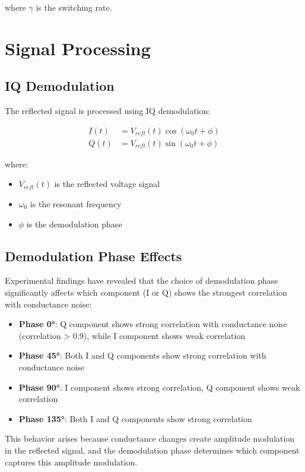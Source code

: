 \documentclass{article}
\begin{document}
where $\gamma$ is the switching rate.

\section{Signal Processing}

\subsection{IQ Demodulation}

The reflected signal is processed using IQ demodulation:

\begin{align}
I(t) &= V_{refl}(t) \cos(\omega_0 t + \phi) \\
Q(t) &= V_{refl}(t) \sin(\omega_0 t + \phi)
\end{align}

where:
\begin{itemize}
\item $V_{refl}(t)$ is the reflected voltage signal
\item $\omega_0$ is the resonant frequency
\item $\phi$ is the demodulation phase
\end{itemize}

\subsection{Demodulation Phase Effects}

Experimental findings have revealed that the choice of demodulation phase significantly affects which component (I or Q) shows the strongest correlation with conductance noise:

\begin{itemize}
\item \textbf{Phase 0°}: Q component shows strong correlation with conductance noise (correlation > 0.9), while I component shows weak correlation
\item \textbf{Phase 45°}: Both I and Q components show strong correlation with conductance noise
\item \textbf{Phase 90°}: I component shows strong correlation, Q component shows weak correlation
\item \textbf{Phase 135°}: Both I and Q components show strong correlation
\end{itemize}

This behavior arises because conductance changes create amplitude modulation in the reflected signal, and the demodulation phase determines which component captures this amplitude modulation.
\end{document}
